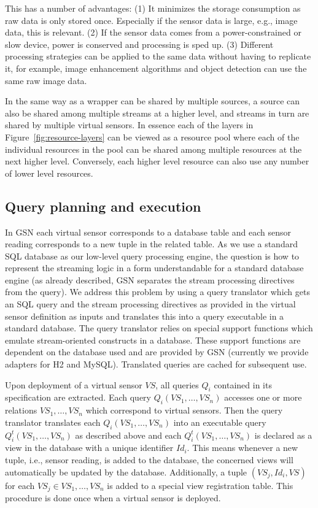 This has a number of advantages: (1) It minimizes the storage consumption as
raw data is only stored once. Especially if the sensor data is large, e.g.,
image data, this is relevant. (2) If the sensor data comes from a
power-constrained or slow device, power is conserved and processing is sped up.
(3) Different processing strategies can be applied to the same data without
having to replicate it, for example, image enhancement algorithms and object
detection can use the same raw image data.

In the same way as a wrapper can be shared by multiple sources, a source
can also be shared among multiple streams at a higher level, and
streams in turn are shared by multiple virtual sensors. In essence each
of the layers in Figure~\ref{fig:resource-layers} can be viewed as a resource
pool where each of the individual resources in the pool can be shared among
multiple resources at the next higher level. Conversely, each higher level
resource can also use any number of lower level resources.

\subsection{Query planning and execution}
\label{sec:query-proc-optim}

In GSN each virtual sensor corresponds to a database table and each sensor
reading corresponds to a new tuple in the related table. As we use a standard
SQL database as our low-level query processing engine, the question is how to
represent the streaming logic in a form understandable for a standard database
engine (as already described, GSN separates the stream processing directives
from the query). We address this problem by using a query translator which gets
an SQL query and the stream processing directives as provided in the virtual
sensor definition as inputs and translates this into a query executable in a
standard database. The query translator relies on special support functions
which emulate stream-oriented constructs in a database. These support functions
are dependent on the database used and are provided by GSN (currently we
provide adapters for H2 and MySQL). Translated queries are cached for subsequent use.

Upon deployment of a virtual sensor $VS$, all queries $Q_i$ contained in its
specification are extracted. Each query $Q_i(VS_1,\dots,VS_n)$ accesses one or
more relations $VS_1,\dots,VS_n$ which correspond to virtual sensors. Then the
query translator translates each $Q_i(VS_1,\dots,VS_n)$ into an executable
query $Q^t_i(VS_1,\dots,VS_n)$ as described above and each
$Q^t_i(VS_1,\dots,VS_n)$ is declared as a view in the database with a unique
identifier $Id_i$. This means whenever a new tuple, i.e., sensor reading, is
added to the database, the concerned views will automatically be updated by the
database. Additionally, a tuple $(VS_j, Id_i, VS)$ for each $VS_j \in
{VS_1,\dots,VS_n}$ is added to a special view registration table. This
procedure is done once when a virtual sensor is deployed.

